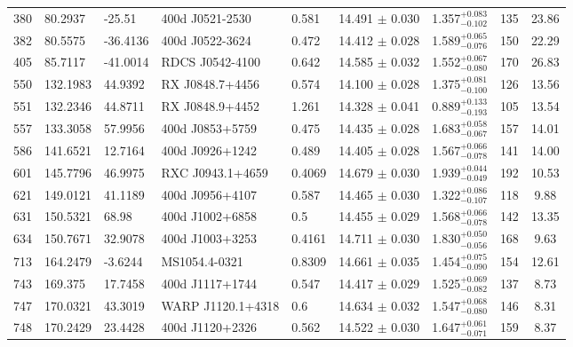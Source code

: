 \documentclass[apj,twocolumn]{emulateapj}
\begin{document}
{\begin{table} [h!]
\begin{tabular}{l l l l l c c c c}
  380  &  80.2937  & -25.51   & 400d J0521-2530     & 0.581  & 14.491 $\pm$  0.030  &     1.357$^{+0.083}_{-0.102}$  &       135 & 23.86 \\
  382  &  80.5575  & -36.4136 & 400d J0522-3624     & 0.472  & 14.412 $\pm$  0.028  &     1.589$^{+0.065}_{-0.076}$  &       150 & 22.29 \\
  405  &  85.7117  & -41.0014 & RDCS J0542-4100     & 0.642  & 14.585 $\pm$  0.032  &     1.552$^{+0.067}_{-0.080}$  &       170 & 26.83 \\
  550  &  132.1983 & 44.9392  & RX J0848.7+4456     & 0.574  & 14.100 $\pm$  0.028  &     1.375$^{+0.081}_{-0.100}$  &       126 & 13.56 \\
  551  &  132.2346 & 44.8711  & RX J0848.9+4452     & 1.261  & 14.328 $\pm$  0.041  &     0.889$^{+0.133}_{-0.193}$  &       105 & 13.54 \\
  557  &  133.3058 & 57.9956  & 400d J0853+5759     & 0.475  & 14.435 $\pm$  0.028  &     1.683$^{+0.058}_{-0.067}$  &       157 & 14.01 \\
  586  &  141.6521 & 12.7164  & 400d J0926+1242     & 0.489  & 14.405 $\pm$  0.028  &     1.567$^{+0.066}_{-0.078}$  &       141 & 14.00 \\
  601  &  145.7796 & 46.9975  & RXC J0943.1+4659    & 0.4069 & 14.679 $\pm$  0.030  &     1.939$^{+0.044}_{-0.049}$  &       192 & 10.53 \\
  621  &  149.0121 & 41.1189  & 400d J0956+4107     & 0.587  & 14.465 $\pm$  0.030  &     1.322$^{+0.086}_{-0.107}$  &       118 & 9.88  \\
  631  &  150.5321 & 68.98    & 400d J1002+6858     & 0.5    & 14.455 $\pm$  0.029  &     1.568$^{+0.066}_{-0.078}$  &       142 & 13.35 \\
  634  &  150.7671 & 32.9078  & 400d J1003+3253     & 0.4161 & 14.711 $\pm$  0.030  &     1.830$^{+0.050}_{-0.056}$  &       168 & 9.63  \\
  713  &  164.2479 & -3.6244  & MS1054.4-0321       & 0.8309 & 14.661 $\pm$  0.035  &     1.454$^{+0.075}_{-0.090}$  &       154 & 12.61 \\
  743  &  169.375  & 17.7458  & 400d J1117+1744     & 0.547  & 14.417 $\pm$  0.029  &     1.525$^{+0.069}_{-0.082}$  &       137 & 8.73  \\
  747  &  170.0321 & 43.3019  & WARP J1120.1+4318   & 0.6    & 14.634 $\pm$  0.032  &     1.547$^{+0.068}_{-0.080}$  &       146 & 8.31  \\
  748  &  170.2429 & 23.4428  & 400d J1120+2326     & 0.562  & 14.522 $\pm$  0.030  &     1.647$^{+0.061}_{-0.071}$  &       159 & 8.37  \\

\end{tabular}
\end{table}}
\end{document}
